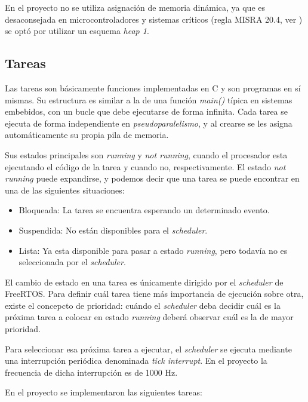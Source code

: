\documentclass{IEEEtran}
\begin{document}
En el proyecto no se utiliza asignación de memoria dinámica, ya que es desaconsejada en microcontroladores y sistemas críticos (regla MISRA 20.4, ver \textcite{misra-c}) se optó por utilizar un esquema \textit{heap 1}.

\subsection{Tareas}
Las tareas son básicamente funciones implementadas en C y son programas en sí mismas. Su estructura es similar a la de una función \textit{main()} típica en sistemas embebidos, con un bucle que debe ejecutarse de forma infinita. Cada tarea se ejecuta de forma independiente en \textit{pseudoparalelismo}, y al crearse se les asigna automáticamente su propia pila de memoria.

Sus estados principales son \textit{running} y \textit{not running}, cuando el procesador esta ejecutando el código de la tarea y cuando no, respectivamente. El estado \textit{not running} puede expandirse, y podemos decir que una tarea se puede encontrar en una de las siguientes situaciones:

\begin{itemize}
    \item Bloqueada: La tarea se encuentra esperando un determinado evento.
    \item Suspendida: No están disponibles para el \textit{scheduler}.
    \item Lista: Ya esta disponible para pasar a estado \textit{running}, pero todavía no es seleccionada por el \textit{scheduler}.
\end{itemize}

El cambio de estado en una tarea es únicamente dirigido por el \textit{scheduler} de FreeRTOS. Para definir cuál tarea tiene más importancia de ejecución sobre otra, existe el concepcto de prioridad: cuándo el \textit{scheduler} deba decidir cuál es la próxima tarea a colocar en estado \textit{running} deberá observar cuál es la de mayor prioridad.

Para seleccionar esa próxima tarea a ejecutar, el \textit{scheduler} se ejecuta mediante una interrupción periódica denominada \textit{tick interrupt}. En el proyecto la frecuencia de dicha interrupción es de 1000 Hz.

En el proyecto se implementaron las siguientes tareas:
\end{document}

